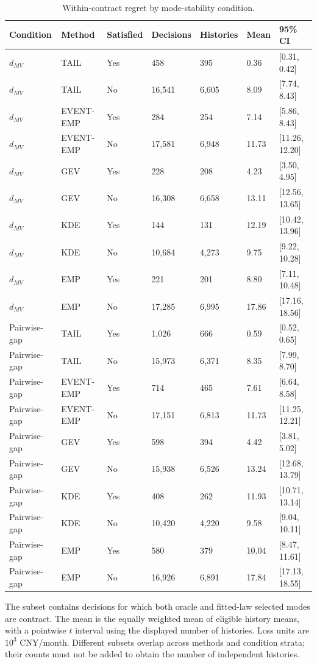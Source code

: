 \begingroup
\fontsize{8.5}{10.5}\selectfont\setlength{\tabcolsep}{3.0pt}\renewcommand{\arraystretch}{1.23}
\begin{table}[tbp]\centering
\caption{Within-contract regret by mode-stability condition.}\label{tab:si-stability-condition}
\begin{tabular}{@{}lllllll@{}}\toprule
Condition & Method & Satisfied & Decisions & Histories & Mean & 95\% CI\\\midrule
$d_{MV}$ & TAIL & Yes & 458 & 395 & 0.36 & [0.31, 0.42]\\
$d_{MV}$ & TAIL & No & 16,541 & 6,605 & 8.09 & [7.74, 8.43]\\
$d_{MV}$ & EVENT-EMP & Yes & 284 & 254 & 7.14 & [5.86, 8.43]\\
$d_{MV}$ & EVENT-EMP & No & 17,581 & 6,948 & 11.73 & [11.26, 12.20]\\
$d_{MV}$ & GEV & Yes & 228 & 208 & 4.23 & [3.50, 4.95]\\
$d_{MV}$ & GEV & No & 16,308 & 6,658 & 13.11 & [12.56, 13.65]\\
$d_{MV}$ & KDE & Yes & 144 & 131 & 12.19 & [10.42, 13.96]\\
$d_{MV}$ & KDE & No & 10,684 & 4,273 & 9.75 & [9.22, 10.28]\\
$d_{MV}$ & EMP & Yes & 221 & 201 & 8.80 & [7.11, 10.48]\\
$d_{MV}$ & EMP & No & 17,285 & 6,995 & 17.86 & [17.16, 18.56]\\
Pairwise-gap & TAIL & Yes & 1,026 & 666 & 0.59 & [0.52, 0.65]\\
Pairwise-gap & TAIL & No & 15,973 & 6,371 & 8.35 & [7.99, 8.70]\\
Pairwise-gap & EVENT-EMP & Yes & 714 & 465 & 7.61 & [6.64, 8.58]\\
Pairwise-gap & EVENT-EMP & No & 17,151 & 6,813 & 11.73 & [11.25, 12.21]\\
Pairwise-gap & GEV & Yes & 598 & 394 & 4.42 & [3.81, 5.02]\\
Pairwise-gap & GEV & No & 15,938 & 6,526 & 13.24 & [12.68, 13.79]\\
Pairwise-gap & KDE & Yes & 408 & 262 & 11.93 & [10.71, 13.14]\\
Pairwise-gap & KDE & No & 10,420 & 4,220 & 9.58 & [9.04, 10.11]\\
Pairwise-gap & EMP & Yes & 580 & 379 & 10.04 & [8.47, 11.61]\\
Pairwise-gap & EMP & No & 16,926 & 6,891 & 17.84 & [17.13, 18.55]\\
\bottomrule
\end{tabular}
\par\smallskip\noindent\begin{minipage}{\linewidth}\footnotesize The subset contains decisions for which both oracle and fitted-law selected modes are contract. The mean is the equally weighted mean of eligible history means, with a pointwise $t$ interval using the displayed number of histories. Loss units are $10^3$ CNY/month. Different subsets overlap across methods and condition strata; their counts must not be added to obtain the number of independent histories.\end{minipage}
\end{table}
\endgroup
